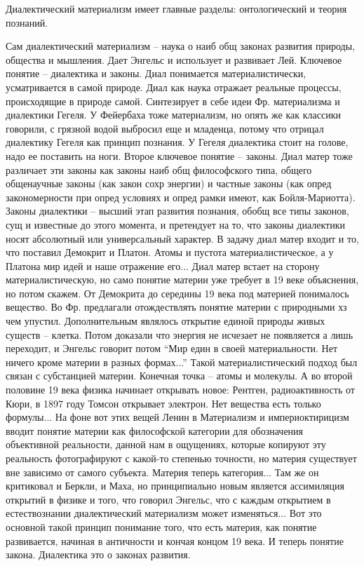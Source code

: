 \documentclass[a4paper, 12pt]{article}
\begin{document}
Диалектический материализм имеет главные разделы: онтологический 
и теория познаний.

Сам диалектический материализм -- наука о наиб общ законах развития 
природы, общества и мышления. Дает Энгельс и использует и развивает Лей. 
Ключевое понятие -- диалектика и законы. Диал понимается 
материалистически, усматривается в самой природе. Диал как наука 
отражает реальные процессы, происходящие в природе самой. Синтезирует 
в себе идеи Фр. материализма и диалектики Гегеля. У Фейербаха тоже 
материализм, но опять же как классики говорили, с грязной водой выбросил 
еще и младенца, потому что отрицал диалектику Гегеля как принцип 
познания. У Гегеля диалектика стоит на голове, надо ее поставить на 
ноги. Второе ключевое понятие -- законы. Диал матер тоже различает эти 
законы как законы наиб общ философского типа, общего общенаучные законы 
(как закон сохр энергии) и частные законы (как опред закономерности при 
опред условиях и опред рамки имеют, как Бойля-Мариотта). Законы 
диалектики -- высший этап развития познания, обобщ все типы законов, сущ 
и известные до этого момента, и претендует на то, что законы диалектики 
носят абсолютный или универсальный характер. В задачу диал матер входит 
и то, что поставил Демокрит и Платон. Атомы и пустота 
материалистическое, а у Платона мир идей и наше отражение его... Диал 
матер встает на сторону материалистическую, но само понятие материи уже 
требует в 19 веке объяснения, но потом скажем. От Демокрита до середины 
19 века под материей понималось вещество. Во Фр. предлагали 
отождествлять понятие материи с природными хз чем упустил. 
Дополнительным являлось открытие единой природы живых существ -- клетка. 
Потом доказали что энергия не исчезает не появляется а лишь переходит, 
и Энгельс говорит потом ``Мир един в своей материальности. Нет ничего 
кроме материи в разных формах...'' Такой материалистический подход был 
связан с субстанцией материи. Конечная точка -- атомы и молекулы. А во 
второй половине 19 века физика начинает открывать новое: Рентген, 
радиоактивность от Кюри, в 1897 году Томсон открывает электрон. Нет 
вещества есть только формулы... На фоне вот этих вещей Ленин 
в Материализм и империоктирицизм вводит понятие материи как философской 
категории для обозначения объективной реальности, данной нам 
в ощущениях, которые копируют эту реальность фотографируют с какой-то 
степенью точности, но материя существует вне зависимо от самого 
субъекта. Материя теперь категория... Там же он критиковал и Беркли, 
и Маха, но принципиально новым является ассимиляция открытий в физике 
и того, что говорил Энгельс, что с каждым открытием в естествознании 
диалектический материализм может изменяться... Вот это основной такой 
принцип понимание того, что есть материя, как понятие развивается, 
начиная в античности и кончая концом 19 века. И теперь понятие закона. 
Диалектика это о законах развития.
\end{document}
